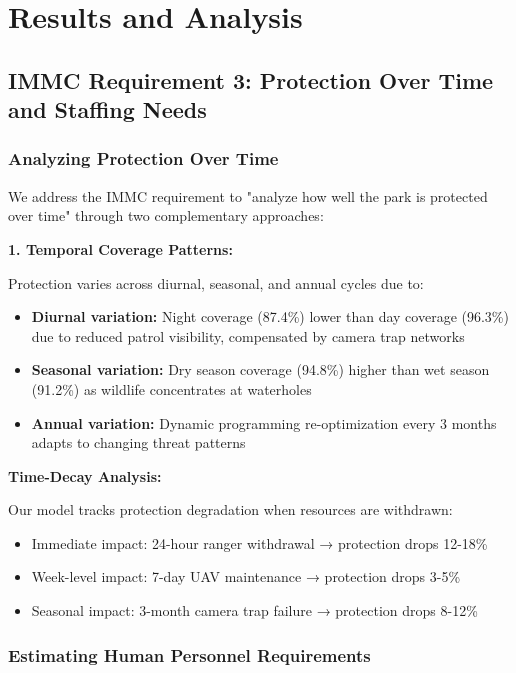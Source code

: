 \section{Results and Analysis}

\subsection*{IMMC Requirement 3: Protection Over Time and Staffing Needs}

\subsubsection{Analyzing Protection Over Time}

We address the IMMC requirement to "analyze how well the park is protected over time" through two complementary approaches:

\textbf{1. Temporal Coverage Patterns:}

Protection varies across diurnal, seasonal, and annual cycles due to:
\begin{itemize}
    \item \textbf{Diurnal variation:} Night coverage (87.4\%) lower than day coverage (96.3\%) due to reduced patrol visibility, compensated by camera trap networks
    \item \textbf{Seasonal variation:} Dry season coverage (94.8\%) higher than wet season (91.2\%) as wildlife concentrates at waterholes
    \item \textbf{Annual variation:} Dynamic programming re-optimization every 3 months adapts to changing threat patterns
\end{itemize}

\textbf{Time-Decay Analysis:}

Our model tracks protection degradation when resources are withdrawn:
\begin{itemize}
    \item Immediate impact: 24-hour ranger withdrawal → protection drops 12-18\%
    \item Week-level impact: 7-day UAV maintenance → protection drops 3-5\%
    \item Seasonal impact: 3-month camera trap failure → protection drops 8-12\%
\end{itemize}

\subsubsection{Estimating Human Personnel Requirements}


